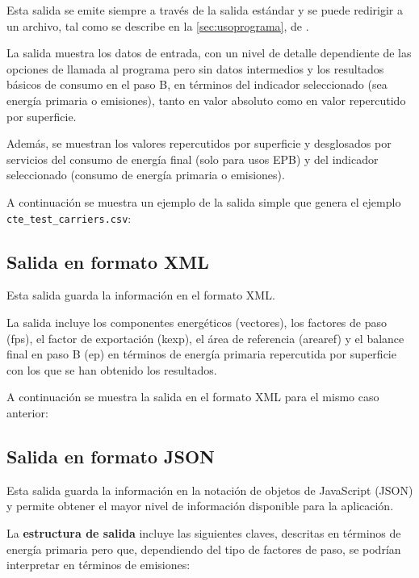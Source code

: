 \documentclass[10pt,notitlepage,oneside,a4paper]{article}
\begin{document}
Esta salida se emite siempre a través de la salida estándar y se puede redirigir a un archivo, tal como se describe en la \autoref{sec:usoprograma}, de .

La salida muestra los datos de entrada, con un nivel de detalle dependiente de las opciones de llamada al programa pero sin datos intermedios y los resultados básicos de consumo en el paso B, en términos del indicador seleccionado (sea energía primaria o emisiones), tanto en valor absoluto como en valor repercutido por superficie.

Además, se muestran los valores repercutidos por superficie y desglosados por servicios del consumo de energía final (solo para usos EPB) y del indicador seleccionado (consumo de energía primaria o emisiones).

A continuación se muestra un ejemplo de la salida simple que genera el ejemplo \texttt{cte\_test\_carriers.csv}:



\newpage
\subsection{Salida en formato XML}

Esta salida guarda la información en el formato XML.

La salida incluye los componentes energéticos (vectores), los factores de paso (fps), el factor de exportación (kexp), el área de referencia (arearef) y el balance final en paso B (ep) en términos de energía primaria repercutida por superficie  con los que se han obtenido los resultados.

A continuación se muestra la salida en el formato XML para el mismo caso anterior:



\newpage
\subsection{Salida en formato JSON}

Esta salida guarda la información en la notación de objetos de JavaScript (JSON) y permite obtener el mayor nivel de información disponible para la aplicación.

La \textbf{estructura de salida} incluye las siguientes claves, descritas en términos de energía primaria pero que, dependiendo del tipo de factores de paso, se podrían interpretar en términos de emisiones:
\end{document}
